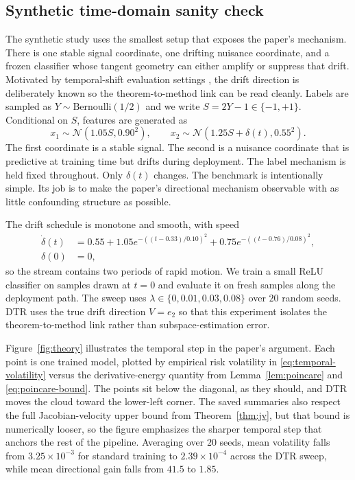 \documentclass[conference]{IEEEtran}
\begin{document}
\subsection{Synthetic time-domain sanity check}
The synthetic study uses the smallest setup that exposes the paper's mechanism. There is one stable signal coordinate, one drifting nuisance coordinate, and a frozen classifier whose tangent geometry can either amplify or suppress that drift. Motivated by temporal-shift evaluation settings \cite{yao-wildtime,han-temporal}, the drift direction is deliberately known so the theorem-to-method link can be read cleanly. Labels are sampled as $Y\sim\mathrm{Bernoulli}(1/2)$ and we write $S=2Y-1\in\{-1,+1\}$. Conditional on $S$, features are generated as
\[
x_1\sim\mathcal N(1.05S,0.90^2),
\qquad
x_2\sim\mathcal N(1.25S+\delta(t),0.55^2).
\]
The first coordinate is a stable signal. The second is a nuisance coordinate that is predictive at training time but drifts during deployment. The label mechanism is held fixed throughout. Only $\delta(t)$ changes.
The benchmark is intentionally simple. Its job is to make the paper's directional mechanism observable with as little confounding structure as possible.

The drift schedule is monotone and smooth, with speed
\begin{align*}
\dot\delta(t)
&=
0.55
+ 1.05e^{-((t-0.33)/0.10)^2}
+ 0.75e^{-((t-0.76)/0.08)^2}, \\
\delta(0) &= 0,
\end{align*}
so the stream contains two periods of rapid motion. We train a small ReLU classifier on samples drawn at $t=0$ and evaluate it on fresh samples along the deployment path. The sweep uses $\lambda\in\{0,0.01,0.03,0.08\}$ over $20$ random seeds. DTR uses the true drift direction $V=e_2$ so that this experiment isolates the theorem-to-method link rather than subspace-estimation error.

Figure~\ref{fig:theory} illustrates the temporal step in the paper's argument. Each point is one trained model, plotted by empirical risk volatility in \eqref{eq:temporal-volatility} versus the derivative-energy quantity from Lemma~\ref{lem:poincare} and \eqref{eq:poincare-bound}. The points sit below the diagonal, as they should, and DTR moves the cloud toward the lower-left corner. The saved summaries also respect the full Jacobian-velocity upper bound from Theorem~\ref{thm:jv}, but that bound is numerically looser, so the figure emphasizes the sharper temporal step that anchors the rest of the pipeline. Averaging over $20$ seeds, mean volatility falls from $3.25\times10^{-3}$ for standard training to $2.39\times10^{-4}$ across the DTR sweep, while mean directional gain falls from $41.5$ to $1.85$.
\end{document}
